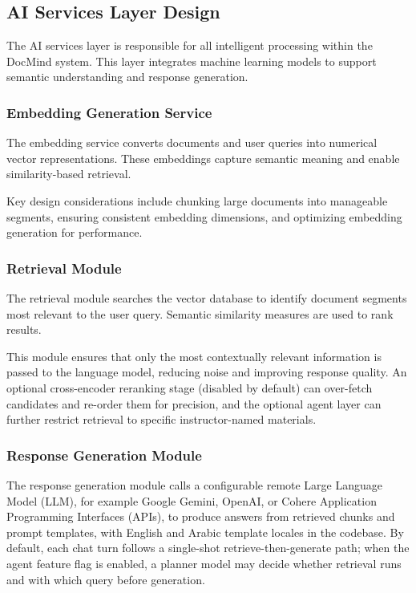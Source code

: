 \documentclass[12pt, a4paper, oneside]{report}
\let\oldsubsection\subsection
\renewcommand{\subsection}{%
  \addtocontents{toc}{\protect\needspace{3\baselineskip}}%
  \oldsubsection
}
\begin{document}
\newpage

\subsection{AI Services Layer Design}

The AI services layer is responsible for all intelligent processing within the DocMind system. This layer integrates machine learning models to support semantic understanding and response generation.

\subsubsection{Embedding Generation Service}

The embedding service converts documents and user queries into numerical vector representations. These embeddings capture semantic meaning and enable similarity-based retrieval.

Key design considerations include chunking large documents into manageable segments, ensuring consistent embedding dimensions, and optimizing embedding generation for performance.

\subsubsection{Retrieval Module}

The retrieval module searches the vector database to identify document segments most relevant to the user query. Semantic similarity measures are used to rank results.

This module ensures that only the most contextually relevant information is passed to the language model, reducing noise and improving response quality. An optional cross-encoder reranking stage (disabled by default) can over-fetch candidates and re-order them for precision, and the optional agent layer can further restrict retrieval to specific instructor-named materials.

\subsubsection{Response Generation Module}

The response generation module calls a configurable remote Large Language Model (LLM), for example Google Gemini, OpenAI, or Cohere Application Programming Interfaces (APIs), to produce answers from retrieved chunks and prompt templates, with English and Arabic template locales in the codebase. By default, each chat turn follows a single-shot retrieve-then-generate path; when the agent feature flag is enabled, a planner model may decide whether retrieval runs and with which query before generation.
\end{document}

